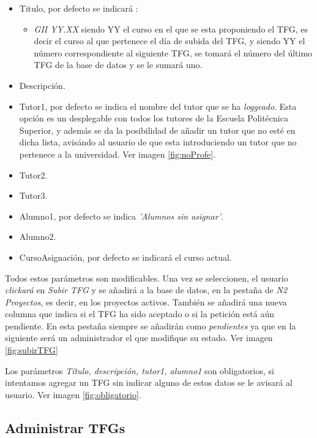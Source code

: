 \begin{itemize}
	\item Titulo, por defecto se indicará :
	\begin{itemize}
		\item \emph{GII YY.XX} siendo YY el curso en el que se esta proponiendo el TFG, es decir el curso al que pertenece el día de subida del TFG, y siendo YY el número correspondiente al siguiente TFG, se tomará el número del último TFG de la base de datos y se le sumará uno.
	\end{itemize}
	\item Descripción.
	\item Tutor1, por defecto se indica el nombre del tutor que se ha \emph{loggeado}. Esta opción es un desplegable con todos los tutores de la Escuela Politécnica Superior, y además se da la posibilidad de añadir un tutor que no esté en dicha lista, avisándo al usuario de que esta introduciendo un tutor que no pertenece a la universidad. Ver imagen \ref{fig:noProfe}.
	\item Tutor2.
	\item Tutor3.
	\item Alumno1, por defecto se indica \emph{'Alumnos sin asignar'}.
	\item Alumno2.
	\item CursoAsignación, por defecto se indicará el curso actual.
\end{itemize}

Todos estos parámetros son modificables. Una vez se seleccionen, el usuario \emph{clickará} en \emph{Subir TFG} y se añadirá a la base de datos, en la pestaña de \emph{N2 Proyectos}, es decir, en los proyectos activos.
También se añadirá una nueva columna que indica si el TFG ha sido aceptado o si la petición está aún pendiente. En esta pestaña siempre se añadirán como \emph{pendientes} ya que en la siguiente será un administrador el que modifique su estado. Ver imagen \ref{fig:subirTFG}


Los parámetros \emph{Título, descripción, tutor1, alumno1} son obligatorios, si intentamos agregar un TFG sin indicar alguno de estos datos se le avisará al usuario. Ver imagen \ref{fig:obligatorio}.


\subsection{Administrar TFGs}

